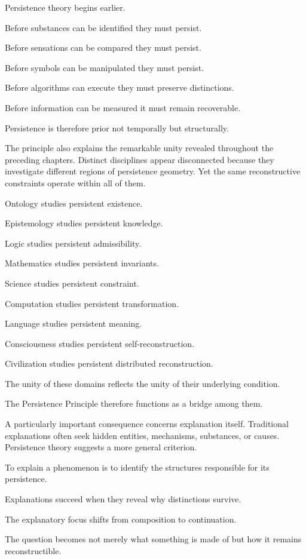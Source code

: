 \documentclass[12pt,oneside]{article}
\theoremstyle{definition}
\begin{document}
Persistence theory begins earlier.

Before substances can be identified they must persist.

Before sensations can be compared they must persist.

Before symbols can be manipulated they must persist.

Before algorithms can execute they must preserve distinctions.

Before information can be measured it must remain recoverable.

Persistence is therefore prior not temporally but structurally.

The principle also explains the remarkable unity revealed throughout the preceding chapters. Distinct disciplines appear disconnected because they investigate different regions of persistence geometry. Yet the same reconstructive constraints operate within all of them.

Ontology studies persistent existence.

Epistemology studies persistent knowledge.

Logic studies persistent admissibility.

Mathematics studies persistent invariants.

Science studies persistent constraint.

Computation studies persistent transformation.

Language studies persistent meaning.

Consciousness studies persistent self-reconstruction.

Civilization studies persistent distributed reconstruction.

The unity of these domains reflects the unity of their underlying condition.

The Persistence Principle therefore functions as a bridge among them.

A particularly important consequence concerns explanation itself. Traditional explanations often seek hidden entities, mechanisms, substances, or causes. Persistence theory suggests a more general criterion.

To explain a phenomenon is to identify the structures responsible for its persistence.

Explanations succeed when they reveal why distinctions survive.

The explanatory focus shifts from composition to continuation.

The question becomes not merely what something is made of but how it remains reconstructible.
\end{document}
